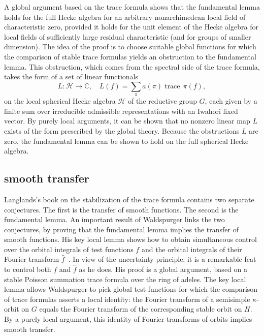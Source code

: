 \documentclass[brochure,english,12pt]{bourbaki}
\def\op#1{{\operatorname{#1}}}
\newcommand{\ring}[1]{\mathbb{#1}}
\begin{document}
 A global argument based on
the trace formula shows that the fundamental lemma holds for the full
Hecke algebra for an arbitrary nonarchimedean local field of
characteristic zero, provided it holds for the unit element of the
Hecke algebra for local fields of sufficiently large residual
characteristic (and for groups of smaller dimension).  
The idea of the proof is to choose suitable global
functions for which the comparison of stable trace formulas yields an
obstruction to the fundamental lemma.  This obstruction, which comes from the
spectral side of the trace formula, takes the form
of a set of linear functionals  
\[
L:{\mathcal H}\to\ring{C},\quad L(f) = \sum_\pi a(\pi) \op{trace}\,\pi(f),
\]
on the local spherical Hecke
algebra ${\mathcal H}$ of the reductive group $G$, each given by a finite sum over
irreducible admissible representations with an Iwahori fixed vector.
By purely local arguments, it
can be shown that no nonzero linear map $L$ exists of the form
prescribed by the global theory.  
Because the obstructions $L$ are zero,
the fundamental lemma can be shown to hold on the full spherical Hecke algebra.


\subsection{smooth transfer}

Langlands's book on the stabilization of the trace formula contains
two separate conjectures.  The first is the transfer of smooth
functions.  The second is the fundamental lemma.  An important result
of Waldspurger links the two conjectures, by proving that the
fundamental lemma implies the transfer of smooth functions.  
His key local lemma shows how to obtain simultaneous control over the
orbital integrals of test functions $f$ and the orbital integrals of
their Fourier transform $\hat f$~\cite[Prop.~8.2]{W}.  
In view of the uncertainty principle, it is a remarkable feat to
control both $f$ and $\hat f$ as he does.
His proof is a global argument, based on a stable Poisson summation
trace formula over the ring of adeles.  The key local lemma allows
Waldspurger to pick global test functions for which the comparison of
trace formulas asserts a local identity: the Fourier transform of a
semisimple $\kappa$-orbit on $G$ equals the Fourier transform of the
corresponding stable orbit on $H$.  By a purely local argument, this
identity of Fourier transforms of orbits implies smooth transfer.
\end{document}
